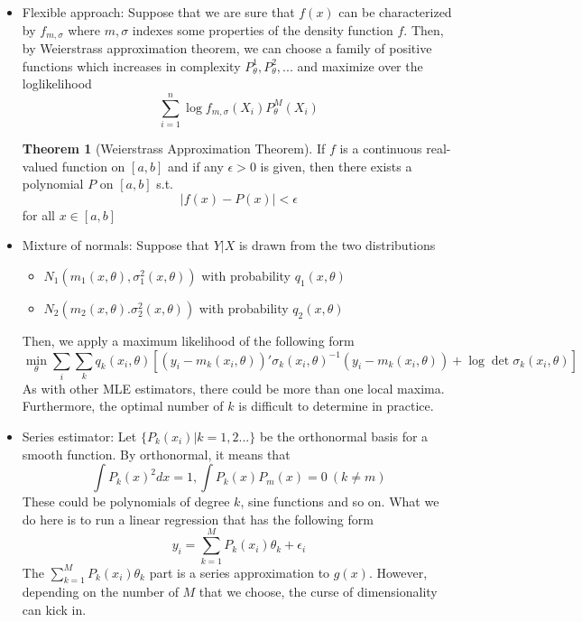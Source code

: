 \documentclass[12pt]{article}
\theoremstyle{definition}
\theoremstyle{property}
\theoremstyle{assumption}
\theoremstyle{example}
\theoremstyle{comment}
\newtheorem{theorem}{Theorem}[section]
\begin{document}
\begin{itemize}
\item Flexible approach: Suppose that we are sure that $f(x)$ can be characterized by $f_{m,\sigma}$ where $m,\sigma$ indexes some properties of the density function $f$. Then, by Weierstrass approximation theorem, we can choose a family of positive functions which increases in complexity $P_\theta^1, P_\theta^2,...$ and maximize over the loglikelihood
\[
\sum_{i=1}^n \log{f_{m,\sigma}(X_i)}P_\theta^M(X_i)
\]
\begin{mdframed}[backgroundcolor=green!5] 
\begin{theorem}[Weierstrass Approximation Theorem]  If $f$ is a continuous real-valued function on $[a,b]$ and if any $\epsilon>0$ is given, then there exists a polynomial $P$ on $[a,b]$ s.t. 
\[
|f(x)-P(x)|<\epsilon
\]
for all $x\in[a,b]$
\end{theorem}
\end{mdframed}
\item Mixture of normals: Suppose that $Y|X$ is drawn from the two distributions
\begin{itemize}
\item $N_1(m_1(x,\theta), \sigma_1^2(x,\theta))$ with probability $q_1(x,\theta)$
\item $N_2(m_2(x,\theta). \sigma_2^2(x,\theta))$ with probability $q_2(x,\theta)$
\end{itemize}
Then, we apply a maximum likelihood of the following form
\[
\min_\theta \sum_i\sum_k q_k(x_i,\theta)[(y_i-m_k(x_i,\theta))'\sigma_k(x_i,\theta)^{-1}(y_i-m_k(x_i,\theta))+\log\det{\sigma_k(x_i,\theta)}]
\]
As with other MLE estimators, there could be more than one local maxima. Furthermore, the optimal number of $k$ is difficult to determine in practice.
\item Series estimator: Let $\{P_k(x_i)|k=1,2...\}$ be the orthonormal basis for a smooth function. By orthonormal, it means that
\[
\int P_k(x)^2 dx=1, \int P_k(x) P_m(x)=0 \ (k\neq m)
\]
 These could be polynomials of degree $k$, sine functions and so on. What we do here is to run a linear regression that has the following form
\[
y_i = \sum_{k=1}^MP_k(x_i)\theta_k+\epsilon_i
\]
The $\sum_{k=1}^MP_k(x_i)\theta_k$ part is a series approximation to $g(x)$. However, depending on the number of $M$ that we choose, the curse of dimensionality can kick in. 
\end{itemize}

\end{document}
